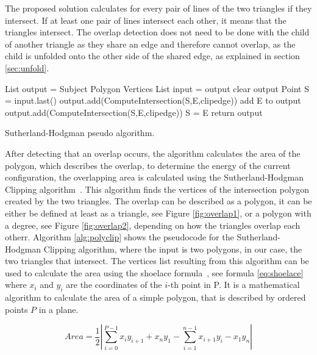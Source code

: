 \documentclass[draft,final]{vutinfth} %
\begin{document}
The proposed solution calculates for every pair of lines of the two triangles if they intersect. If at least one pair of lines intersect each other, it means that the triangles intersect. The overlap detection does not need to be done with the child of another triangle as they share an edge and therefore cannot overlap, as the child is unfolded onto the other side of the shared edge, as explained in section \ref{sec:unfold}.

\begin{algorithm}
List output = Subject Polygon Vertices\;
{
List input = output\;
clear output\;
Point S = input.last()\;
{
{
{
output.add(ComputeIntersection(S,E,clipedge))\;
}
add E to output\;
}
{
{
output.add(ComputeIntersection(S,E,clipedge))\;
}
S = E\;
}
}
}
return output\;
\caption{Sutherland-Hodgman pseudo algorithm.}
\label{alg:polyclip}
\end{algorithm}

After detecting that an overlap occurs, the algorithm calculates the area of the polygon, which describes the overlap, to determine the energy of the current configuration, the overlapping area is calculated using the Sutherland-Hodgman Clipping algorithm~\cite{sutherland1974reentrant}. This algorithm finds the vertices of the intersection polygon created by the two triangles. The overlap can be described as a polygon, it can be either be defined at least as a triangle, see Figure \ref{fig:overlap1}, or a polygon with a degree, see Figure \ref{fig:overlap2}, depending on how the triangles overlap each otherr. Algorithm \ref{alg:polyclip} shows the pseudocode for the Sutherland-Hodgman Clipping algorithm, where the input is two polygons, in our case, the two triangles that intersect. The vertices list resulting from this algorithm can be used to calculate the area using the shoelace formula~\cite{vslapak2017automated}, see formula \ref{eq:shoelace} where $x_i$ and $y_i$ are the coordinates of the $i$-th point in P. It is a mathematical algorithm to calculate the area of a simple polygon, that is described by ordered points $P$ in a plane.

\begin{equation}
Area = \frac{1}{2} \left| \sum_{i=0}^{P-1} x_iy_{i+1} + x_ny_1 - \sum_{i=1}^{n-1} x_{i+1}y_i - x_1y_n \right|
\label{eq:shoelace}
\end{equation}
\end{document}
